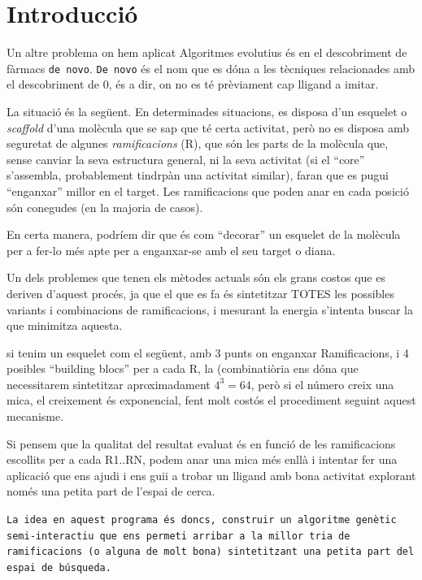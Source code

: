 \documentclass[titlepage,a4paper,12pt]{book}
\begin{document}
\tableofcontents
\section{Introducció} %
	\label{sec:Introduccio}
	Un altre problema on hem aplicat Algoritmes evolutius és en el descobriment
	de fàrmacs \texttt{de novo}.  \texttt{De novo} és el nom que es dóna a les
	tècniques relacionades amb el descobriment de 0, és a dir, on no es té
	prèviament cap lligand a imitar.

	La situació és la següent.  En determinades situacions, es disposa d'un
	esquelet o \textit{scaffold} d'una molècula que se sap que té certa
	activitat, però no es disposa amb seguretat de algunes
	\textit{ramificacions} (R), que són les parts de la molècula que, sense
	canviar la seva estructura general, ni la seva activitat (si el ``core''
	s'assembla, probablement tindrpàn una activitat similar), faran que es pugui
	``enganxar'' millor en el target.  Les ramificacions que poden anar en cada
	posició són conegudes (en la majoria de casos).

	En certa manera, podríem dir que és com ``decorar'' un esquelet de la
	molècula per a fer-lo més apte per a enganxar-se amb el seu target o diana.

	Un dels problemes que tenen els mètodes actuals són els grans costos
	que es deriven d'aquest procés, ja que el que es fa és sintetitzar TOTES les
possibles variants i combinacions de ramificacions, i mesurant la energia %
	s'intenta buscar la que minimitza aquesta.

	si tenim un esquelet com el següent, amb 3 punts on enganxar Ramificacions,
	i 4 posibles ``building blocs'' per a cada R, la (combinatiòria ens dóna que
	necessitarem sintetitzar aproximadament $4^3 = 64 $, però si el número creix
	una mica, el creixement és exponencial, fent molt costós el procediment
	seguint aquest mecanisme.

	Si pensem que la qualitat del resultat evaluat és en funció de les
	ramificacions escollits per a cada R1..RN, podem anar una mica més enllà i
	intentar fer una aplicació que ens ajudi i ens guii a trobar un lligand amb
	bona activitat explorant només una petita part de l'espai de cerca.
	
	\texttt{La idea en aquest programa és doncs, construir un algoritme genètic
	semi-interactiu que ens permeti arribar a la millor tria de ramificacions (o
	alguna de molt bona) sintetitzant una petita part del espai de búsqueda.}
\end{document}
